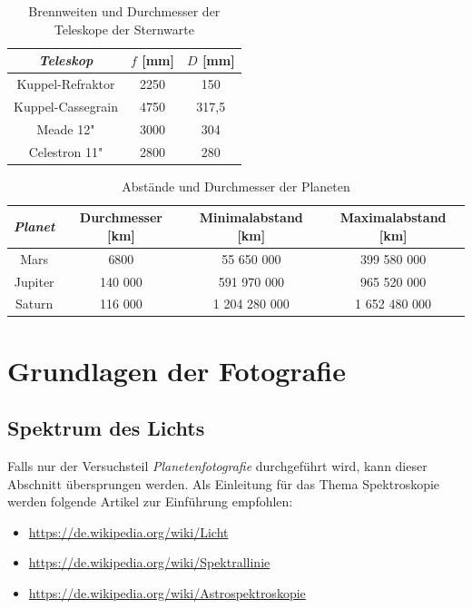 \documentclass[10pt,a4paper,titlepage]{article}
\begin{document}
\begin{table}
\begin{center}
\begin{tabular}{|c|c|c|}
\hline
\emph{Teleskop} & $f$ [mm] & $D$ [mm] \\
\hline
Kuppel-Refraktor & 2250 & 150 \\
Kuppel-Cassegrain & 4750 & 317,5 \\
Meade 12" & 3000 & 304 \\
Celestron 11" & 2800 & 280 \\
\hline
\end{tabular}
\caption{Brennweiten und Durchmesser der Teleskope der Sternwarte}
\label{stw-teleskope}
\end{center}
\end{table}

\begin{table}
\begin{center}
\begin{tabular}{|c|c|c|c|}
\hline
\emph{Planet} & Durchmesser [km] & Minimalabstand [km] & Maximalabstand [km] \\
\hline
Mars & 6800 & 55 650 000 & 399 580 000 \\
Jupiter & 140 000 & 591 970 000 & 965 520 000 \\
Saturn & 116 000 & 1 204 280 000 & 1 652 480 000\\
\hline
\end{tabular}
\caption{Abstände und Durchmesser der Planeten}
\label{planeten}
\end{center}
\end{table}

\section{Grundlagen der Fotografie}
\subsection{Spektrum des Lichts}
Falls nur der Versuchsteil \textit{Planetenfotografie} durchgeführt wird, kann dieser Abschnitt übersprungen werden. Als Einleitung für das Thema Spektroskopie werden folgende Artikel zur Einführung empfohlen:
\begin{itemize}
\item \url{https://de.wikipedia.org/wiki/Licht}
\item \url{https://de.wikipedia.org/wiki/Spektrallinie}
\item \url{https://de.wikipedia.org/wiki/Astrospektroskopie}
\end{itemize}
\end{document}

